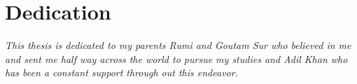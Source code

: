 \chapter*{Dedication}
\textit{This thesis is dedicated to my parents Rumi and Goutam Sur who believed in me and sent me half way across the world to pursue my studies and Adil Khan who has been a constant support through out this endeavor.}
